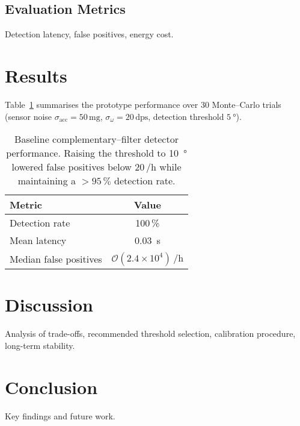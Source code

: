 \documentclass{article} %
\begin{document}
\subsection{Evaluation Metrics}
Detection latency, false positives, energy cost.

\section{Results}
Table~\ref{tab:perf} summarises the prototype performance over \num{30} Monte--Carlo trials (sensor noise $\sigma_{\mathrm{acc}}=\num{50}\,\mathrm{mg}$, $\sigma_{\omega}=\num{20}\,\mathrm{dps}$, detection threshold $\SI{5}{\degree}$).

\begin{table}[h]
\centering
\begin{tabular}{lc}
\hline
Metric & Value \\
\hline
Detection rate & \num{100}\,\% \\
Mean latency & \SI{0.03}{\second} \\
Median false positives & $\mathcal{O}(2.4\times10^{4})$\,/h \\
\hline
\end{tabular}
\caption{Baseline complementary--filter detector performance. Raising the threshold to \SI{10}{\degree} lowered false positives below \num{20}\,/h while maintaining a $>\num{95}\,\%$ detection rate.}
\label{tab:perf}
\end{table}

\section{Discussion}
Analysis of trade-offs, recommended threshold selection, calibration procedure, long-term stability.

\section{Conclusion}
Key findings and future work.



\end{document}
